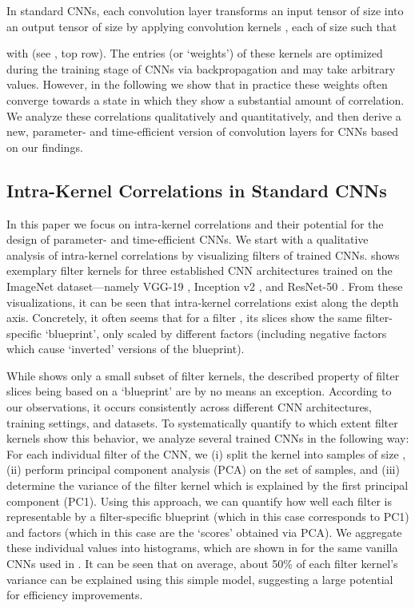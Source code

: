 \documentclass[10pt,twocolumn,letterpaper]{article}
\begin{document}
In standard CNNs, each convolution layer transforms an input tensor  of size  into an output tensor  of size  by applying convolution kernels , each of size  such that

with  (see , top row).
The entries (or `weights') of these  kernels are optimized during the training stage of CNNs via backpropagation and may take arbitrary values.
However, in the following we show that in practice these weights often converge towards a state in which they show a substantial amount of correlation.
We analyze these correlations qualitatively and quantitatively, and then derive a new, parameter- and time-efficient version of convolution layers for CNNs based on our findings.

\subsection{Intra-Kernel Correlations in Standard CNNs}
\label{subsec:intraKernelCorrelations}
In this paper we focus on intra-kernel correlations and their potential for the design of parameter- and time-efficient CNNs.
We start with a qualitative analysis of intra-kernel correlations by visualizing filters of trained CNNs.
 shows exemplary filter kernels for three established CNN architectures trained on the ImageNet dataset---namely VGG-19 \cite{simonyan2014very}, Inception v2 \cite{ioffe2015batch}, and ResNet-50 \cite{he2016deep,he2016identity}.
From these visualizations, it can be seen that intra-kernel correlations exist along the depth axis.
Concretely, it often seems that for a filter , its slices  show the same filter-specific  `blueprint', only scaled by different factors (including negative factors which cause `inverted' versions of the blueprint).

While  shows only a small subset of filter kernels, the described property of filter slices being based on a `blueprint' are by no means an exception.
According to our observations, it occurs consistently across different CNN architectures, training settings, and datasets.
To systematically quantify to which extent filter kernels show this behavior, we analyze several trained CNNs in the following way:
For each individual filter of the CNN, we
(i) split the  kernel into  samples of size ,
(ii) perform principal component analysis (PCA) on the set of  samples, and
(iii) determine the variance of the filter kernel which is explained by the first principal component (PC1).
Using this approach, we can quantify how well each filter is representable by a  filter-specific blueprint (which in this case corresponds to PC1) and  factors (which in this case are the `scores' obtained via PCA).
We aggregate these individual values into histograms, which are shown in  for the same vanilla CNNs used in .
It can be seen that on average, about 50\% of each filter kernel's variance can be explained using this simple model, suggesting a large potential for efficiency improvements.
\end{document}
